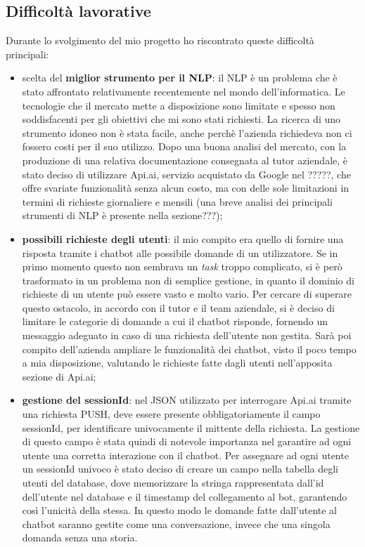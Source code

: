 \subsection{Difficoltà lavorative}
Durante lo svolgimento del mio progetto ho riscontrato queste difficoltà principali:
\begin{itemize}
	\item scelta del \textbf{miglior strumento per il \gls{NLP}}: il \gls{NLP} è un problema che è stato affrontato relativamente recentemente nel mondo dell'informatica. Le tecnologie che il mercato mette a disposizione sono limitate e spesso non soddisfacenti per gli obiettivi che mi sono stati richiesti. La ricerca di uno strumento idoneo non è stata facile, anche perchè l'azienda richiedeva non ci fossero costi per il suo utilizzo. Dopo una buona analisi del mercato, con la produzione di una relativa documentazione consegnata al tutor aziendale, è stato deciso di utilizzare Api.ai, servizio acquistato da Google nel ?????, che offre svariate funzionalità senza alcun costo, ma con delle sole limitazioni in termini di richieste giornaliere e mensili (una breve analisi dei principali strumenti di NLP è presente nella sezione???);
	\item \textbf{possibili richieste degli utenti}: il mio compito era quello di fornire una risposta tramite i \gls{chatbot} alle possibile domande di un utilizzatore. Se in primo momento questo non sembrava un \emph{task} troppo complicato, si è però trasformato in un problema non di semplice gestione, in quanto il dominio di richieste di un utente può essere vasto e molto vario. Per cercare di superare questo ostacolo, in accordo con il tutor e il team aziendale, si è deciso di limitare le categorie di domande a cui il \gls{chatbot} risponde, fornendo un messaggio adeguato in caso di una richiesta dell'utente non gestita. Sarà poi compito dell'azienda ampliare le funzionalità dei \gls{chatbot}, visto il poco tempo a mia disposizione, valutando le richieste fatte dagli utenti nell'apposita sezione di Api.ai;
	\item \textbf{gestione del sessionId}: nel JSON utilizzato per interrogare Api.ai tramite una richiesta PUSH, deve essere presente obbligatoriamente il campo sessionId, per identificare univocamente il mittente della richiesta. La gestione di questo campo è stata quindi di notevole importanza nel garantire ad ogni utente una corretta interazione con il \gls{chatbot}. Per assegnare ad ogni utente un sessionId univoco è stato deciso di creare un campo nella tabella degli utenti del database, dove memorizzare la stringa rappresentata dall'id dell'utente nel database e il timestamp del collegamento al bot, garantendo così l'unicità della stessa. In questo modo le domande fatte dall'utente al \gls{chatbot} saranno gestite come una conversazione, invece che una singola domanda senza una storia.
\end{itemize}

